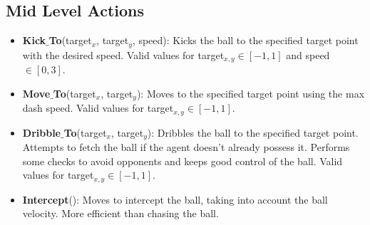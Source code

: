 \documentclass[12pt]{article}
\begin{document}
\subsection{Mid Level Actions}
\label{sec:mid_level_actions}
\begin{itemize}[noitemsep]
\item{\textbf{Kick$\_$To}(target$_x$, target$_y$, speed): Kicks the
  ball to the specified target point with the desired speed. Valid
  values for target$_{x,y} \in [-1,1]$ and speed $\in [0,3]$.}
\item{\textbf{Move$\_$To}(target$_x$, target$_y$): Moves to the
  specified target point using the max dash speed. Valid values for
  target$_{x,y} \in [-1,1]$.}
\item{\textbf{Dribble$\_$To}(target$_x$, target$_y$): Dribbles the
  ball to the specified target point. Attempts to fetch the ball if
  the agent doesn't already possess it. Performs some checks to avoid
  opponents and keeps good control of the ball. Valid values for
  target$_{x,y} \in [-1,1]$.}
\item{\textbf{Intercept}(): Moves to intercept the ball, taking into
  account the ball velocity. More efficient than chasing the ball.}
\end{itemize}
\end{document}
